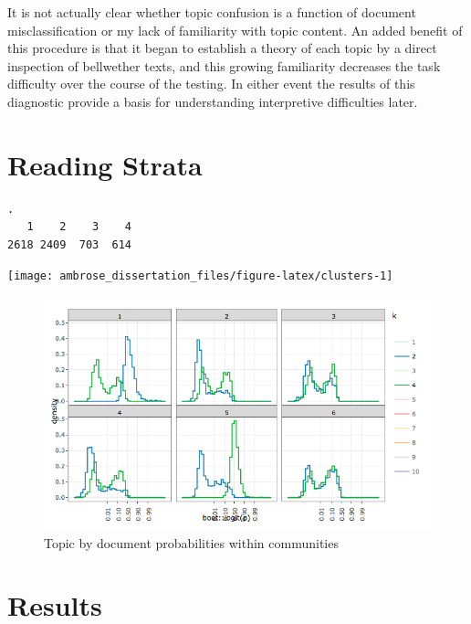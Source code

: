 \documentclass[]{book}
\theoremstyle{definition}
\theoremstyle{definition}
\theoremstyle{definition}
\theoremstyle{remark}
\begin{document}
It is not actually clear whether topic confusion is a function of
document misclassification or my lack of familiarity with topic content.
An added benefit of this procedure is that it began to establish a
theory of each topic by a direct inspection of bellwether texts, and
this growing familiarity decreases the task difficulty over the course
of the testing. In either event the results of this diagnostic provide a
basis for understanding interpretive difficulties later.

\hypertarget{reading-strata}{%
\section{Reading Strata}\label{reading-strata}}

\begin{verbatim}
.
   1    2    3    4 
2618 2409  703  614 
\end{verbatim}

\begin{center}\texttt{[image: ambrose\_dissertation\_files/figure-latex/clusters-1]} \end{center}

\begin{figure}

{\centering \includegraphics[width=0.9\linewidth]{img/clusters2} 

}

\caption{Topic by document probabilities within communities}\label{fig:clusters2}
\end{figure}

\hypertarget{results}{%
\section{Results}\label{results}}
\end{document}
